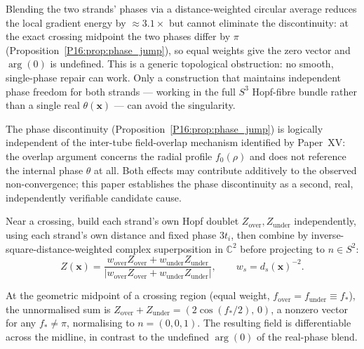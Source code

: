 \begin{remark}
\label{P16:rem:naive_smoothing_fails}
Blending the two strands' phases via a distance-weighted circular
average reduces the local gradient energy by $\approx3.1\times$ but
cannot eliminate the discontinuity: at the exact crossing midpoint the
two phases differ by $\pi$ (Proposition~\ref{P16:prop:phase_jump}), so equal
weights give the zero vector and $\arg(0)$ is undefined. This is a
generic topological obstruction: no smooth, single-phase repair can work.
Only a construction that maintains independent phase freedom for both
strands --- working in the full $S^3$ Hopf-fibre bundle rather than a
single real $\theta(\mathbf{x})$ --- can avoid the singularity.
\end{remark}

\begin{remark}
\label{P16:rem:two_mechanisms}
The phase discontinuity (Proposition~\ref{P16:prop:phase_jump}) is logically
independent of the inter-tube field-overlap mechanism identified by
Paper~XV: the overlap argument concerns the radial profile $f_0(\rho)$
and does not reference the internal phase $\theta$ at all. Both effects
may contribute additively to the observed non-convergence; this paper
establishes the phase discontinuity as a second, real, independently
verifiable candidate cause.
\end{remark}

\begin{construction}
\label{P16:constr:s3lift}
Near a crossing, build each strand's own Hopf doublet
$Z_{\mathrm{over}},Z_{\mathrm{under}}$ independently, using each strand's
own distance and fixed phase $3t_i$, then combine by
inverse-square-distance-weighted complex superposition in $\mathbb{C}^2$
before projecting to $n\in S^2$:
\begin{equation}
  Z(\mathbf{x}) = \frac{w_{\mathrm{over}}Z_{\mathrm{over}}
    + w_{\mathrm{under}}Z_{\mathrm{under}}}
    {\bigl|w_{\mathrm{over}}Z_{\mathrm{over}}
    + w_{\mathrm{under}}Z_{\mathrm{under}}\bigr|},
  \qquad w_s = d_s(\mathbf{x})^{-2}.
\end{equation}
\end{construction}

\begin{proposition}
\label{P16:prop:s3_smooth}
At the geometric midpoint of a crossing region (equal weight,
$f_{\mathrm{over}}=f_{\mathrm{under}}\equiv f_*$), the unnormalised sum is
$Z_{\mathrm{over}}+Z_{\mathrm{under}}=(2\cos(f_*/2),\,0)$, a nonzero
vector for any $f_*\neq\pi$, normalising to $n=(0,0,1)$. The resulting
field is differentiable across the midline, in contrast to the undefined
$\arg(0)$ of the real-phase blend.
\end{proposition}


